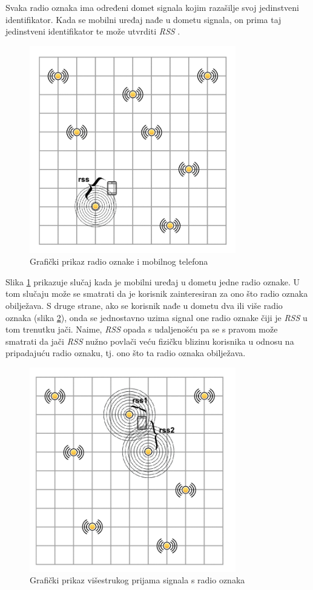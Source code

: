 \documentclass[times, utf8, diplomski, numeric]{fer}
\begin{document}
Svaka radio oznaka ima određeni domet signala kojim razašilje 
svoj jedinstveni identifikator. Kada se mobilni uređaj nađe u dometu signala, on
prima taj jedinstveni identifikator te može utvrditi \emph{RSS} . 

\begin{figure}[htb]
	\centering
	\includegraphics[width=9cm]{images/gridbeacons1cell.png}
	\caption{Grafički prikaz radio oznake i mobilnog telefona}
	\label{fig:RssOneCell}
\end{figure}

Slika \ref{fig:RssOneCell} prikazuje slučaj kada je mobilni
uređaj u dometu jedne radio oznake. U tom slučaju može se smatrati da je
korisnik zainteresiran za ono što radio oznaka obilježava. S druge strane,
ako se korisnik nađe u dometu dva ili više radio oznaka (slika
\ref{fig:RssTwoCells}), onda se jednostavno uzima signal one radio oznake čiji
je \emph{RSS} u tom trenutku jači. Naime, \emph{RSS} opada s udaljenošću pa se s
pravom može smatrati da jači \emph{RSS} nužno povlači veću fizičku blizinu
korisnika u odnosu na pripadajuću radio oznaku, tj. ono što ta radio oznaka
obilježava.

\begin{figure}[htb]
	\centering
	\includegraphics[width=9cm]{images/gridbeacons2cells.png}
	\caption{Grafički prikaz višestrukog prijama signala s radio oznaka}
	\label{fig:RssTwoCells}
\end{figure}
\end{document}

